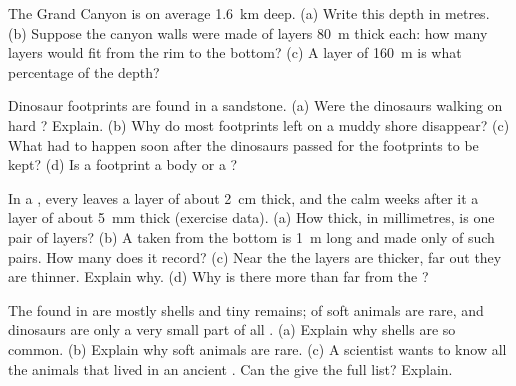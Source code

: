\begin{exercise}[$\star\star$]\label{exo:g7:sediments-and-fossils:9}
The Grand Canyon is on average \qty{1.6}{km} deep. (a) Write this depth in
metres. (b) Suppose the canyon walls were made of layers \qty{80}{m}
thick each: how many layers would fit from the rim to the bottom? (c) A
layer of \qty{160}{m} is what percentage of the depth?
\end{exercise}

\begin{exercise}[$\star\star$]\label{exo:g7:sediments-and-fossils:10}
Dinosaur footprints are found in a sandstone. (a) Were the dinosaurs
walking on hard ? Explain. (b) Why do most footprints left on a
muddy shore disappear? (c) What had to happen soon after the dinosaurs
passed for the footprints to be kept? (d) Is a footprint a body 
or a ?
\end{exercise}

\begin{exercise}[$\star\star\star$]\label{exo:g7:sediments-and-fossils:11}
In a , every  leaves a layer of  about \qty{2}{cm} thick,
and the calm weeks after it a layer of  about \qty{5}{mm} thick
(exercise data). (a) How thick, in millimetres, is one pair of layers?
(b) A  taken from the  bottom is \qty{1}{m} long and made only of
such pairs. How many  does it record? (c) Near the   the
 layers are thicker, far out they are thinner. Explain why. (d) Why
is there more  than  far from the ?
\end{exercise}

\begin{exercise}[$\star\star\star$]\label{exo:g7:sediments-and-fossils:12}
The  found in  are mostly shells and tiny remains; 
of soft animals are rare, and dinosaurs are only a very small part of
all . (a) Explain why shells are so common. (b) Explain why soft
animals are rare. (c) A scientist wants to know all the animals that
lived in an ancient . Can the  give the full list? Explain.
\end{exercise}


